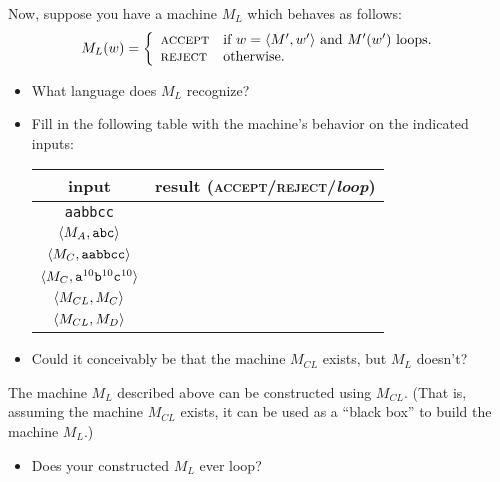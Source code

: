 \documentclass[twoside,letterpaper,openany]{book}
\begin{document}
\begin{exer2}\label{tm:canloopone}
Now, suppose you have a machine $M_{L}$ which behaves as follows:
\[ M_L(w) = \bigg\{
\begin{array}{ll}
\textsc{accept} &  \textrm{if $w = {\langle{M', w'}\rangle}$ and $M'(w')$ loops.} \\
\textsc{reject} & \textrm{otherwise.}
\end{array}
\]

\begin{itemize}
\item What language does $M_L$ recognize?
\item Fill in the following table with the machine's behavior on the indicated inputs:
\begin{center}
\renewcommand{\arraystretch}{1.25}
\begin{tabular}[c]{c|c}
input & result (\textsc{accept}/\textsc{reject}/\textit{loop}) \\\hline
\texttt{aabbcc} & \\
${\langle{M_{A}, \texttt{abc}}\rangle}$ & \\
${\langle{M_{C}, \texttt{aabbcc}}\rangle}$ & \\
${\langle{M_{C}, \texttt{a}^{10}\texttt{b}^{10}\texttt{c}^{10}}\rangle}$ & \\
${\langle{M_{CL}, M_{C}}\rangle}$ & \\
${\langle{M_{CL}, M_{D}}\rangle}$ & \\
\end{tabular}
\end{center}

\item Could it conceivably be that the machine $M_{CL}$ exists, but $M_L$ doesn't? 
\end{itemize}
\end{exer2}

\begin{stmt2}
The  machine $M_L$ described above can be constructed using $M_{CL}$. (That is, assuming the machine $M_{CL}$ exists, it can be  used as a ``black box'' to build the machine $M_L$.)
\begin{itemize}
\item Does your constructed $M_L$ ever loop?
\end{itemize}

\end{stmt2}
\end{document}
